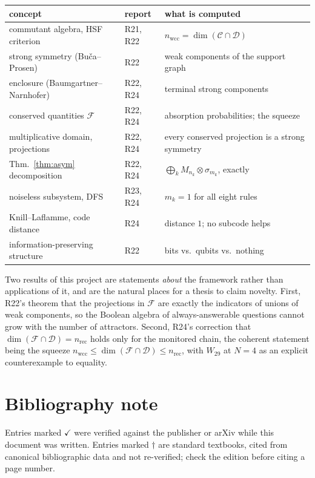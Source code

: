 \documentclass[11pt]{article}
\newcommand{\C}{\mathcal{C}}
\newcommand{\F}{\mathcal{F}}
\newcommand{\D}{\mathcal{D}}
\theoremstyle{plain}
\theoremstyle{remark}
\begin{document}
\begin{center}
\small
\begin{tabular}{lll}
\toprule
concept & report & what is computed \\
\midrule
commutant algebra, HSF criterion & R21, R22 &
  $n_{\mathrm{wcc}} = \dim(\C \cap \D)$ \\
strong symmetry (Bu\v{c}a--Prosen) & R22 &
  weak components of the support graph \\
enclosure (Baumgartner--Narnhofer) & R22, R24 &
  terminal strong components \\
conserved quantities $\F$ & R22, R24 &
  absorption probabilities; the squeeze \\
multiplicative domain, projections & R22, R24 &
  every conserved projection is a strong symmetry \\
Thm.~\ref{thm:asym} decomposition & R22, R24 &
  $\bigoplus_k M_{n_k}\otimes\sigma_{m_k}$, exactly \\
noiseless subsystem, DFS & R23, R24 &
  $m_k = 1$ for all eight rules \\
Knill--Laflamme, code distance & R24 &
  distance $1$; no subcode helps \\
information-preserving structure & R22 &
  bits vs.\ qubits vs.\ nothing \\
\bottomrule
\end{tabular}
\end{center}

\noindent Two results of this project are statements \emph{about} the framework
rather than applications of it, and are the natural places for a thesis to
claim novelty. First, R22's theorem that the projections in $\F$ are exactly
the indicators of unions of weak components, so the Boolean algebra of
always-answerable questions cannot grow with the number of attractors. Second,
R24's correction that $\dim(\F\cap\D) = n_{\mathrm{rec}}$ holds only for the
monitored chain, the coherent statement being the squeeze
$n_{\mathrm{wcc}} \le \dim(\F\cap\D) \le n_{\mathrm{rec}}$, with $W_{29}$ at
$N=4$ as an explicit counterexample to equality.

\section*{Bibliography note}
\label{sec:biblio}

Entries marked $\checkmark$ were verified against the publisher or arXiv while
this document was written. Entries marked $\dagger$ are standard textbooks,
cited from canonical bibliographic data and not re-verified; check the edition
before citing a page number.
\end{document}
